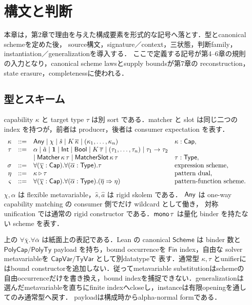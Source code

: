 \section{構文と判断}

本章は，第2章で理由を与えた構成要素を形式的な記号へ落とす．型とcanonical schemeを定めた後，
source構文，signature／context，三状態，判断family，instantiation／generalizationを導入する．
ここで定義する記号が第4--6章の規則の入力となり，canonical scheme lawsとsupply boundsが第7章の
reconstruction，state erasure，completenessに使われる．

\subsection{型とスキーム}

capability $\kappa$ と target type $\tau$ は別 sort である．matcher と slot は同じ二つの
index を持つが，前者は producer，後者は consumer expectation を表す．
\[
\begin{array}{rcll}
\kappa &::=& \mathsf{Any}\mid\chi\mid\hat{s}
  \mid K\,\overline\kappa\mid(\kappa_1,\ldots,\kappa_n)
  & \kappa:\mathsf{Cap},\\
\tau &::=& \alpha\mid\hat a\mid\mathbf 1\mid\mathsf{Int}
  \mid\mathsf{Bool}\mid K\,\overline\tau
  \mid(\tau_1,\ldots,\tau_n)\mid\tau_1\to\tau_2
  & \\
&& \mid\mathsf{Matcher}\,\kappa\,\tau\mid\mathsf{MatcherSlot}\,\kappa\,\tau
  & \tau:\mathsf{Type},\\
\sigma &::=& \forall(\overline\chi:\mathsf{Cap}).
  \forall(\overline\alpha:\mathsf{Type}).\tau
  & \text{expression scheme},\\
\eta &::=& \kappa\mathbin{\triangleright}\tau
  & \text{pattern dual},\\
\varsigma &::=& \forall(\overline\chi:\mathsf{Cap}).
  \forall(\overline\alpha:\mathsf{Type}).
  (\overline\eta\Rightarrow\eta)
  & \text{pattern-function scheme}.
\end{array}
\]
$\chi,\alpha$ は flexible metavariable，$\hat s,\hat a$ は rigid skolem である．
$\mathsf{Any}$ は one-way capability matching の consumer 側でだけ wildcard として働き，
対称 unification では通常の rigid constructor である．$\mathsf{mono}\,\tau$ は量化 binder を持たない
scheme を表す．

上の $\forall\overline\chi.\forall\overline\alpha$ は紙面上の表記である．Lean の canonical
$\mathsf{Scheme}$ は binder 数と $\mathsf{PolyCap}/\mathsf{PolyTy}$ payload を持ち，bound occurrenceを
$\mathsf{Fin}$ index，自由な solver metavariableを $\mathsf{CapVar}/\mathsf{TyVar}$ として別datatypeで
表す．通常型 $\kappa,\tau$ とunifierにはbound constructorを追加しない．従ってmetavariable
substitutionはschemeの自由occurrenceだけを書き換え，bound indexを捕捉できない．generalizationは
選んだmetavariableを直ちにfinite indexへcloseし，instanceは有限openingを通してのみ通常型へ戻す．
payloadは構成時からalpha-normal formである．

